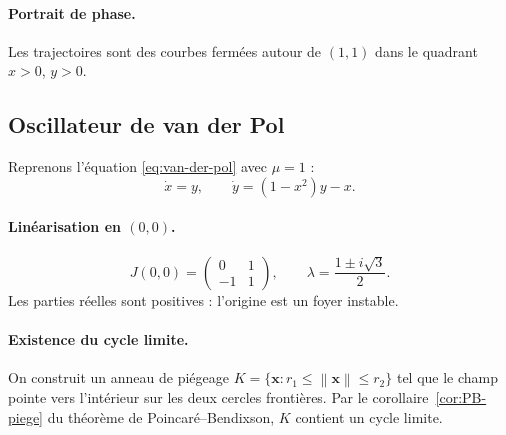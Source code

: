 \documentclass[12pt,a4paper,openany]{book}
\theoremstyle{definition}
\theoremstyle{plain}
\theoremstyle{remark}
\newcommand{\norm}[1]{\left\|#1\right\|}
\begin{document}
\paragraph{Portrait de phase.}
Les trajectoires sont des courbes fermées autour de $(1,1)$
dans le quadrant $x > 0$, $y > 0$.

\begin{center}
\end{center}

\subsection{Oscillateur de van der Pol}
\label{subsec:van-der-pol-detail}

Reprenons l'équation \eqref{eq:van-der-pol} avec $\mu = 1$ :
\[
\dot{x} = y, \qquad \dot{y} = (1 - x^2)y - x.
\]

\paragraph{Linéarisation en $(0,0)$.}
\[
J(0,0) = \begin{pmatrix} 0 & 1 \\ -1 & 1 \end{pmatrix},
\qquad \lambda = \frac{1 \pm i\sqrt{3}}{2}.
\]
Les parties réelles sont positives : l'origine est un foyer instable.

\paragraph{Existence du cycle limite.}
On construit un anneau de piégeage
$K = \{\mathbf{x} : r_1 \leq \norm{\mathbf{x}} \leq r_2\}$
tel que le champ pointe vers l'intérieur sur les deux cercles
frontières. Par le corollaire~\ref{cor:PB-piege} du théorème de
Poincaré--Bendixson, $K$ contient un cycle limite.
\end{document}
